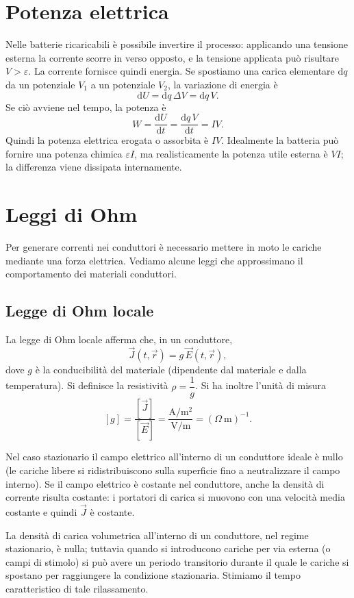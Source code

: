\documentclass{book}
\begin{document}
\section{Potenza elettrica}

Nelle batterie ricaricabili è possibile invertire il processo: applicando una tensione esterna la corrente scorre in verso opposto, e la tensione applicata può risultare \(V>\varepsilon\). La corrente fornisce quindi energia. Se spostiamo una carica elementare \(\mathrm{d}q\) da un potenziale \(V_1\) a un potenziale \(V_2\), la variazione di energia è
\[
\mathrm{d}U = \mathrm{d}q\,\Delta V = \mathrm{d}q\,V.
\]
Se ciò avviene nel tempo, la potenza è
\[
W=\frac{\mathrm{d}U}{\mathrm{d}t}=\frac{\mathrm{d}q\,V}{\mathrm{d}t}=IV.
\]
Quindi la potenza elettrica erogata o assorbita è \(IV\). Idealmente la batteria può fornire una potenza chimica \(\varepsilon I\), ma realisticamente la potenza utile esterna è \(VI\); la differenza viene dissipata internamente.

\section{Leggi di Ohm}

Per generare correnti nei conduttori è necessario mettere in moto le cariche mediante una forza elettrica. Vediamo alcune leggi che approssimano il comportamento dei materiali conduttori.

\subsection{Legge di Ohm locale}
La legge di Ohm locale afferma che, in un conduttore,
\[
\vec{J}(t,\vec{r}) = g\,\vec{E}(t,\vec{r}),
\]
dove \(g\) è la conducibilità del materiale (dipendente dal materiale e dalla temperatura). Si definisce la resistività \(\rho=\dfrac{1}{g}\). Si ha inoltre l'unità di misura
\[
[g]=\frac{[\vec{J}]}{[\vec{E}]}=\frac{\mathrm{A}/\mathrm{m}^2}{\mathrm{V}/\mathrm{m}}=(\Omega\:\mathrm{m})^{-1}.
\]

Nel caso stazionario il campo elettrico all'interno di un conduttore ideale è nullo (le cariche libere si ridistribuiscono sulla superficie fino a neutralizzare il campo interno). Se il campo elettrico è costante nel conduttore, anche la densità di corrente risulta costante: i portatori di carica si muovono con una velocità media costante e quindi \(\vec{J}\) è costante.

La densità di carica volumetrica all'interno di un conduttore, nel regime stazionario, è nulla; tuttavia quando si introducono cariche per via esterna (o campi di stimolo) si può avere un periodo transitorio durante il quale le cariche si spostano per raggiungere la condizione stazionaria. Stimiamo il tempo caratteristico di tale rilassamento.
\end{document}
